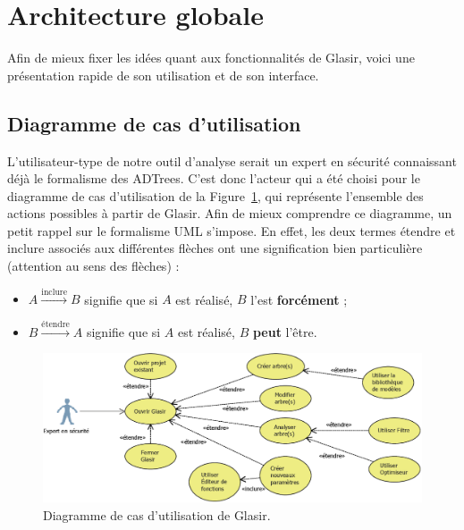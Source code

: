 \section{Architecture globale}
    \label{sec:archiGlobale}
    
    Afin de mieux fixer les idées quant aux fonctionnalités de Glasir, voici une présentation rapide de son utilisation et de son interface.
	    
    \subsection{Diagramme de cas d'utilisation}
    \label{sec:casutil}
    
    L'utilisateur-type de notre outil d'analyse serait un expert en sécurité connaissant déjà le formalisme des ADTrees. C'est donc l'acteur qui a été choisi pour le diagramme de cas d'utilisation de la {\sc Figure}~\ref{fig:use_case}, qui représente l'ensemble des actions possibles à partir de Glasir. Afin de mieux comprendre ce diagramme, un petit rappel sur le formalisme UML s'impose. En effet, les deux termes \og étendre \fg{} et \og inclure \fg{} associés aux différentes flèches ont une signification bien particulière (attention au sens des flèches) :

    \begin{itemize}
    \item[] $ A \stackrel{\text{inclure}}{\longrightarrow} B$ signifie que si $A$ est réalisé, $B$ l'est {\bf forcément} ;
    \item[] $ B \stackrel{\text{étendre}}{\longrightarrow} A$ signifie que si $A$ est réalisé, $B$ {\bf peut} l'être.
    \end{itemize}

    \begin{figure}[H]
        \centering
        \includegraphics[height=0.4\textwidth]{figure/UseCaseDiagram.png}
        \caption{Diagramme de cas d'utilisation de Glasir.}
        \label{fig:use_case}
    \end{figure}

